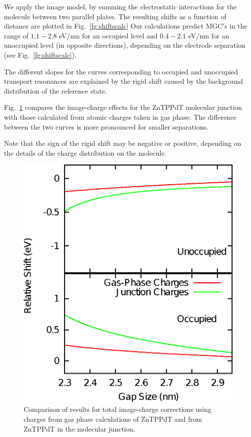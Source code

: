 \documentclass[aip,jcp,a4paper,reprint,floatfix,superscriptaddress]{revtex4-1}
\begin{document}
We apply the image model, by summing the electrostatic interactions for the molecule 
between two parallel plates. 
The resulting shifts as a function of distance are plotted in Fig.~\ref{fg:shiftscalc} 
Our calculations predict MGC's in the range of 
$1.1-2.8$ eV/nm for an occupied level and
$0.4-2.1$ eV/nm for an unoccupied level 
(in opposite directions), depending on the electrode separation (see Fig.~\ref{fg:shiftscalc}).

The different slopes for the curves corresponding to occupied and unoccupied transport resonances are explained by the rigid shift caused by the background distribution of the reference state.

Fig.~\ref{fg:gas_vs_junction} compares the image-charge effects for the ZnTPPdT molecular junction with those calculated from atomic charges taken in gas phase. 
The difference between the two curves is more pronounced for smaller separations.

Note that the sign of the rigid shift may be negative or positive, depending on the details of the charge distribution on the molecule. 

\begin{figure}
\includegraphics[width=.8\columnwidth]{Us_Gas_vs_Junction2}
\caption{Comparison of results for total image-charge corrections using charges from gas phase calculations of ZnTPPdT and from ZnTPPdT in the molecular junction.} \label{fg:gas_vs_junction}
\end{figure}
\end{document}
